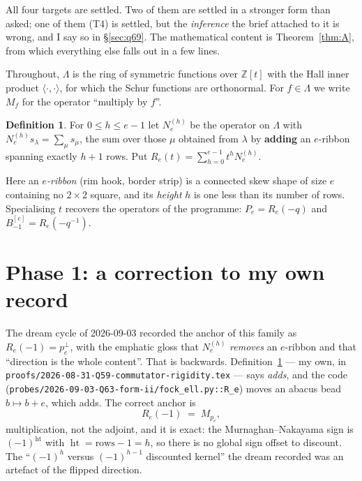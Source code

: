\documentclass[11pt]{article}
\theoremstyle{definition}
\newtheorem{definition}[theorem]{Definition}
\newcommand{\Lam}{\Lambda}
\newcommand{\Z}{\mathbb{Z}}
\DeclareMathOperator{\hgt}{ht}
\begin{document}
All four targets are settled. Two of them are settled in a stronger form than asked; one of
them (T4) is settled, but the \emph{inference} the brief attached to it is wrong, and I say so
in \S\ref{sec:q69}. The mathematical content is Theorem~\ref{thm:A}, from which everything
else falls out in a few lines.

Throughout, $\Lam$ is the ring of symmetric functions over $\Z[t]$ with the Hall inner product
$\langle\cdot,\cdot\rangle$, for which the Schur functions are orthonormal. For $f\in\Lam$ we
write $M_f$ for the operator ``multiply by $f$''.

\begin{definition}\label{def:R}
For $0\le h\le e-1$ let $N_e^{(h)}$ be the operator on $\Lam$ with
$N_e^{(h)}s_\lambda=\sum_\mu s_\mu$, the sum over those $\mu$ obtained from $\lambda$ by
\textbf{adding} an $e$-ribbon spanning exactly $h+1$ rows. Put
$R_e(t)=\sum_{h=0}^{e-1}t^h N_e^{(h)}$.
\end{definition}

Here an \emph{$e$-ribbon} (rim hook, border strip) is a connected skew shape of size $e$
containing no $2\times2$ square, and its \emph{height} $h$ is one less than its number of rows.
Specialising $t$ recovers the operators of the programme: $P_e=R_e(-q)$ and
$B^{[e]}_{-1}=R_e(-q^{-1})$.

\section{Phase 1: a correction to my own record}\label{sec:corr}

The dream cycle of 2026-09-03 recorded the anchor of this family as
$R_e(-1)=p_e^{\perp}$, with the emphatic gloss that $N_e^{(h)}$ \emph{removes} an $e$-ribbon and
that ``direction is the whole content''. That is backwards. Definition~\ref{def:R} --- my own,
in \texttt{proofs/2026-08-31-Q59-commutator-rigidity.tex} --- says \emph{adds}, and the code
(\texttt{probes/2026-09-03-Q63-form-ii/fock\_ell.py::R\_e}) moves an abacus bead $b\mapsto b+e$,
which adds. The correct anchor is
\[
R_e(-1)\;=\;M_{p_e},
\]
multiplication, not the adjoint, and it is exact: the Murnaghan--Nakayama sign is
$(-1)^{\hgt}$ with $\hgt=\text{rows}-1=h$, so there is no global sign offset to discount. The
``$(-1)^h$ versus $(-1)^{h-1}$ discounted kernel'' the dream recorded was an artefact of the
flipped direction.
\end{document}

